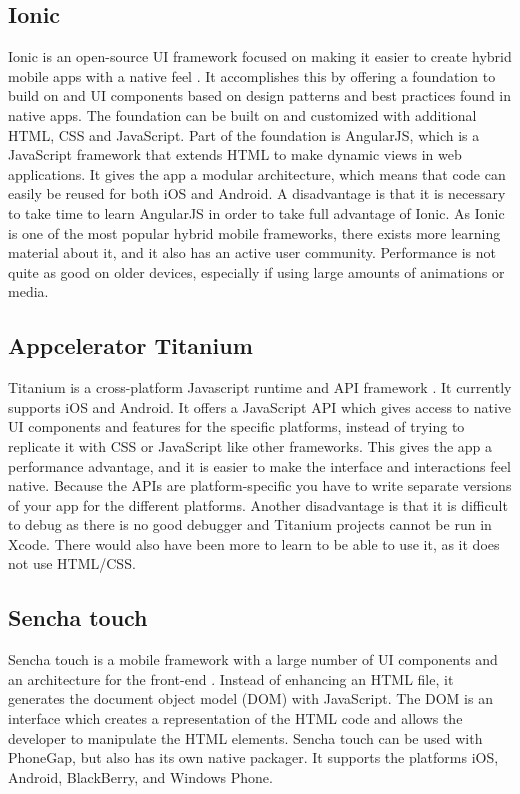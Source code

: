 \subsection{Ionic}
\label{subsec:ionic}

Ionic is an open-source UI framework focused on making it easier to create hybrid mobile apps with a native feel \cite{RA1}. It accomplishes this by offering a foundation to build on and UI components based on design patterns and best practices found in native apps. The foundation can be built on and customized with additional HTML, CSS and JavaScript. Part of the foundation is AngularJS, which is a JavaScript framework that extends HTML to make dynamic views in web applications. It gives the app a modular architecture, which means that code can easily be reused for both iOS and Android. A disadvantage is that it is necessary to take time to learn AngularJS in order to take full advantage of Ionic. As Ionic is one of the most popular hybrid mobile frameworks, there exists more learning material about it, and it also has an active user community. Performance is not quite as good on older devices, especially if using large amounts of animations or media.

\subsection{Appcelerator Titanium}

Titanium is a cross-platform Javascript runtime and API framework \cite{RA3}. It currently supports iOS and Android. It offers a JavaScript API which gives access to native UI components and features for the specific platforms, instead of trying to replicate it with CSS or JavaScript like other frameworks. This gives the app a performance advantage, and it is easier to make the interface and interactions feel native. Because the APIs are platform-specific you have to write separate versions of your app for the different platforms. Another disadvantage is that it is difficult to debug as there is no good debugger and Titanium projects cannot be run in Xcode. There would also have been more to learn to be able to use it, as it does not use HTML/CSS.

\subsection{Sencha touch}

Sencha touch is a mobile framework with a large number of UI components and an architecture for the front-end \cite{RA4}. Instead of enhancing an HTML file, it generates the document object model (DOM) with JavaScript. The DOM is an interface which creates a representation of the HTML code and allows the developer to manipulate the HTML elements. Sencha touch can be used with PhoneGap, but also has its own native packager. It supports the platforms iOS, Android, BlackBerry, and Windows Phone.

